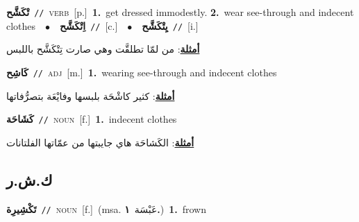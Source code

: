 \documentclass[10pt,a4paper,twoside]{article} %
\begin{document}
\begin{multicols}{2}
{\setlength\topsep{0pt}\textbf{\foreignlanguage{arabic}{تْكَشَّح}}\ {\color{gray}\texttt{//}\color{black}}\ \textsc{verb}\ [p.]\ \textbf{1.}~get dressed immodestly.  \textbf{2.}~wear see-through and indecent clothes\ \ $\bullet$\ \ \setlength\topsep{0pt}\textbf{\foreignlanguage{arabic}{اِتْكَشَّح}}\ {\color{gray}\texttt{//}\color{black}}\ [c.]\ \ $\bullet$\ \ \setlength\topsep{0pt}\textbf{\foreignlanguage{arabic}{يِتْكَشَّح}}\ {\color{gray}\texttt{//}\color{black}}\ [i.]\  \begin{flushright}\color{gray}\foreignlanguage{arabic}{\textbf{\underline{\foreignlanguage{arabic}{أمثلة}}}: من لمّا تطلقَّت وهي صارت تِتْكَشَّح باللبس}\end{flushright}\color{black}} \vspace{2mm}

{\setlength\topsep{0pt}\textbf{\foreignlanguage{arabic}{كَاشِح}}\ {\color{gray}\texttt{//}\color{black}}\ \textsc{adj}\ [m.]\ \textbf{1.}~wearing see-through and indecent clothes\  \begin{flushright}\color{gray}\foreignlanguage{arabic}{\textbf{\underline{\foreignlanguage{arabic}{أمثلة}}}: كثير كاشْحَة بلبسها وفايْعَة بتصرُّفاتها}\end{flushright}\color{black}} \vspace{2mm}

{\setlength\topsep{0pt}\textbf{\foreignlanguage{arabic}{كَشَاحَة}}\ {\color{gray}\texttt{//}\color{black}}\ \textsc{noun}\ [f.]\ \textbf{1.}~indecent clothes\  \begin{flushright}\color{gray}\foreignlanguage{arabic}{\textbf{\underline{\foreignlanguage{arabic}{أمثلة}}}: الكَشاحَة هاي جايبتها من عمّاتها الفلتانات}\end{flushright}\color{black}} \vspace{2mm}

\vspace{-3mm}
\subsection*{\color{blue}\foreignlanguage{arabic}{ك.ش.ر}\color{blue}{}} 

{\setlength\topsep{0pt}\textbf{\foreignlanguage{arabic}{تَكْشِيرِة}}\ {\color{gray}\texttt{//}\color{black}}\ \textsc{noun}\ [f.]\ \color{gray}(msa. \foreignlanguage{arabic}{عَبْسَة}~\foreignlanguage{arabic}{\textbf{١.}})\color{black}\ \textbf{1.}~frown\ } \vspace{2mm}


\end{multicols}
\end{document}
